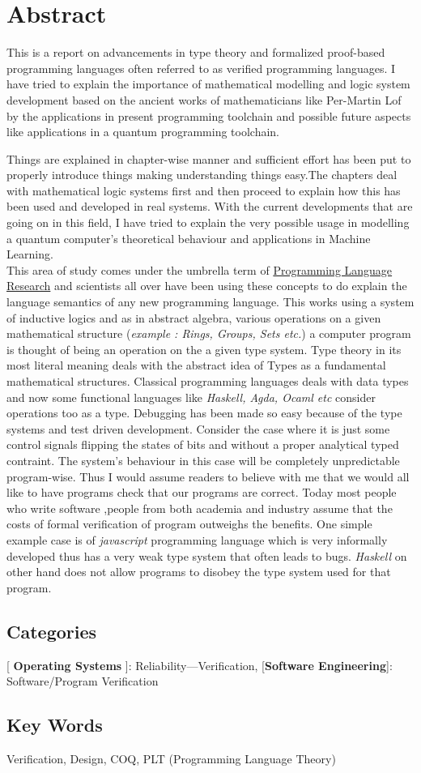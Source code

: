 \chapter*{Abstract}

This is a report on advancements in type theory and formalized proof-based programming languages often referred to as verified programming languages. I have tried to explain the importance of mathematical modelling and logic system development based on the ancient works of mathematicians like Per-Martin Lof by the applications in present programming toolchain and possible future aspects like applications in a quantum  programming toolchain.

Things are explained in chapter-wise manner and sufficient effort has been put to properly introduce things making understanding things easy.The chapters deal with mathematical logic systems first and then proceed to explain how this has been used and developed in real systems. With the current developments that are going on in this field, I have tried to explain the very possible usage in modelling a quantum computer's theoretical behaviour and applications in Machine Learning.\\

This area of study comes under the umbrella term of \underline{Programming Language Research} and scientists all over have been  using these concepts to do explain the language semantics of any new programming language. This works using a system of inductive logics and as in abstract algebra, various operations on a given mathematical structure (\textit{example : Rings, Groups, Sets etc.}) a computer program is thought of being an operation on the a given type system. Type theory in its most literal meaning deals with the abstract idea of Types as a fundamental mathematical structures. Classical programming languages deals with data types and now some functional languages like \textit{Haskell, Agda, Ocaml etc} consider operations too as a type. Debugging has been made so easy because of the type systems and test driven development. Consider the case where it is just some control signals flipping the states of bits and without a proper analytical typed contraint. The system's behaviour in this case will be completely unpredictable program-wise. Thus I would assume readers to believe with me that we would all like to have programs check that our programs are correct. Today most people who write software ,people from both academia and industry assume that the costs of formal verification of program outweighs the benefits. One simple example case is of \textit{javascript} programming language which is very informally developed thus has a very weak type system that often leads to bugs.  \textit{Haskell} on other hand does not allow programs to disobey the type system used for that program.


\section*{Categories}
[ \textbf{Operating Systems} ]:  Reliability—Verification, [\textbf{Software Engineering}]: Software/Program Verification

\section*{Key Words}
Verification, Design, COQ, PLT (Programming Language Theory)


